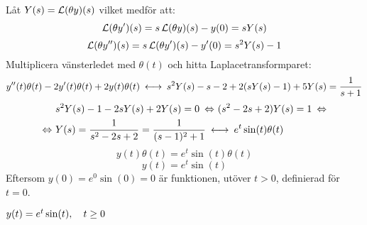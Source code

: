 \begin{task}{5.2}
	Låt $Y(s)=\operatorname{\mathcal{L}}(\theta y)(s)$ vilket medför att:
	\[\operatorname{\mathcal{L}}(\theta y')(s)=s\operatorname{\mathcal{L}}(\theta y)(s)-y(0)=sY(s)\]
	\[\operatorname{\mathcal{L}}(\theta y'')(s)=s\operatorname{\mathcal{L}}(\theta y')(s)-y'(0)=s^2Y(s)-1\]
	Multiplicera vänsterledet med $\theta(t)$ och hitta Laplacetransformparet:
	\[y''(t)\theta(t)-2y'(t)\theta(t)+2y(t)\theta(t) \llra
	s^2Y(s)-s-2+2(sY(s)-1)+5Y(s)=\frac{1}{s+1}\]
	\begin{align*}
	&s^2Y(s)-1-2sY(s)+2Y(s)=0 \lra
	(s^2-2s+2)Y(s)=1 \lra \\ \lra
	&Y(s)=
	\frac{1}{s^2-2s+2}=
	\frac{1}{(s-1)^2+1} \llra
	e^{t}\sin(t)\theta(t)
	\end{align*}
	\[y(t)\theta(t)=e^{t}\sin(t)\theta(t)\]
	\[y(t)=e^{t}\sin(t)\]
	Eftersom $y(0)=e^{0}\sin(0)=0$ är funktionen, utöver $t>0$, definierad för $t=0$.
	
	\ans $y(t)=e^{t}\sin(t), \quad t \ge 0$
\end{task}
